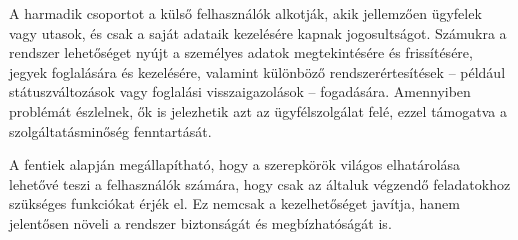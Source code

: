 A harmadik csoportot a külső felhasználók alkotják, akik jellemzően ügyfelek vagy utasok, és csak a saját adataik kezelésére kapnak jogosultságot. Számukra a rendszer lehetőséget nyújt a személyes adatok megtekintésére és frissítésére, jegyek foglalására és kezelésére, valamint különböző rendszerértesítések – például státuszváltozások vagy foglalási visszaigazolások – fogadására. Amennyiben problémát észlelnek, ők is jelezhetik azt az ügyfélszolgálat felé, ezzel támogatva a szolgáltatásminőség fenntartását.

A fentiek alapján megállapítható, hogy a szerepkörök világos elhatárolása lehetővé teszi a felhasználók számára, hogy csak az általuk végzendő feladatokhoz szükséges funkciókat érjék el. Ez nemcsak a kezelhetőséget javítja, hanem jelentősen növeli a rendszer biztonságát és megbízhatóságát is.
